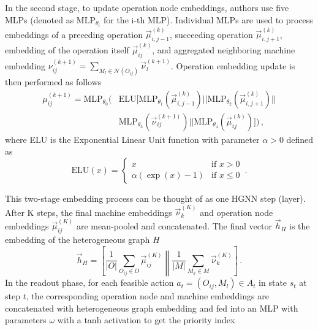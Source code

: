\par
In the second stage, to update operation node embeddings, authors use five MLPs (denoted as $\text{MLP}_{\theta_i}$ for the i-th MLP). Individual MLPs are used to process embeddings of a preceding operation $\vec{\mu}_{i,j-1}^{(k)}$, succeeding operation $\vec{\mu}_{i,j+1}^{(k)}$, embedding of the operation itself $\vec{\mu}_{ij}^{(k)}$, and aggregated neighboring machine embedding $\nu_{ij}^{(k+1)} = \sum_{M_l\in\mathcal{N}(O_{ij})} \vec{\nu}_l^{(k+1)}$. Operation embedding update is then performed as follows \cite{9826438}
\begin{equation}
    \begin{split}
        \mu_{ij}^{(k+1)}  = \text{MLP}_{\theta_0} \Bigg( 
            &\text{ELU} \Big[ 
                \text{MLP}_{\theta_1}\left(\vec{\mu}_{i,j-1}^{(k)}\right) || 
                \text{MLP}_{\theta_2}\left(\vec{\mu}_{i,j+1}^{(k)}\right) || \\
                &\text{MLP}_{\theta_3}\left(\vec{\nu}_{ij}^{(k+1)}\right) || 
                \text{MLP}_{\theta_4}\left(\vec{\mu}_{ij}^{(k)}\right)
            \Big]    
        \Bigg) \, ,
\end{split}
\end{equation}
where ELU is the Exponential Linear Unit function with parameter $\alpha > 0$ defined as \cite{elu_activation} 
\begin{equation}
    \text{ELU}(x) = \begin{cases} x & \mbox{if } x > 0 \\ \alpha (\exp(x) - 1) & \mbox{if } x \leq 0 \end{cases} \, .
\end{equation}
\par
This two-stage embedding process can be thought of as one HGNN step (layer). After K steps, the final machine embeddings $\vec{\nu}_k^{(K)}$ and operation node embeddings $\vec{\mu}_{ij}^{(K)}$ are mean-pooled and concatenated. The final vector $\vec{h}_H$ is the embedding of the heterogeneous graph $H$ \cite{9826438}
\begin{equation}
    \vec{h}_H = 
        \left [
            \frac{1}{|O|}\sum_{O_{ij} \in O} \vec{\mu}_{ij}^{(K)} 
            \middle\| 
            \frac{1}{|M|}\sum_{M_k \in M} \vec{\nu}_k^{(K)}
        \right ] \, .
\end{equation}
In the readout phase, for each feasible action $a_t = (O_{ij}, M_l) \in A_t$ in state $s_t$ at step $t$, the corresponding operation node and machine embeddings are concatenated with heterogeneous graph embedding and fed into an MLP with parameters $\omega$ with a tanh activation to get the priority index \cite{9826438}
